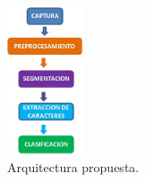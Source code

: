 \documentclass[12pt,letterpaper,titlepage]{article}
\begin{document}
\begin{figure}
  \centering
    \includegraphics[width=0.2\textwidth]{EsquemaBasicoRecPatronesPrev}
  \caption{Arquitectura propuesta.}
  \label{fig1:SW}
\end{figure}
\end{document}
